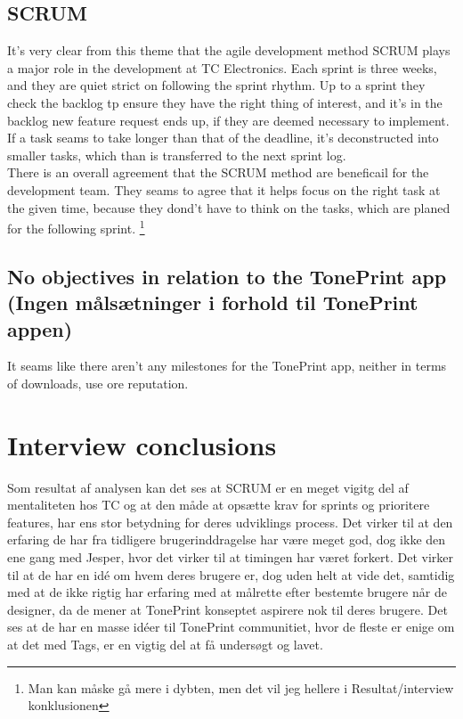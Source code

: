 \subsection*{SCRUM}
\label{ThemeScrum}
It's very clear from this theme that the agile development method SCRUM plays a major role in the development at TC Electronics. Each sprint is three weeks, and they are quiet strict on following the sprint rhythm. Up to a sprint they check the backlog tp ensure they have the right thing of interest, and it's in the backlog new feature request ends up, if they are deemed necessary to implement. If a task seams to take longer than that of the deadline, it's deconstructed into smaller tasks, which than is transferred to the next sprint log.\\
There is an overall agreement that the SCRUM method are beneficail for the development team. They seams to agree that it helps focus on the right task at the given time, because they dond't have to think on the tasks, which are planed for the following sprint. \footnote{Man kan måske gå mere i dybten, men det vil jeg hellere i Resultat/interview konklusionen} 

\subsection*{No objectives in relation to the TonePrint app (Ingen målsætninger i forhold til TonePrint appen)} 
\label{ThemeNoObjectivesInRelationToTheTonePrintApp}
It seams like there aren't any milestones for the TonePrint app, neither in terms of downloads, use ore reputation. 


\section{Interview conclusions}
\label{InterviewConclusion}
Som resultat af analysen kan det ses at SCRUM er en meget vigitg del af mentaliteten hos TC og at den måde at opsætte krav for sprints og prioritere features, har ens stor betydning for deres udviklings process. Det virker til at den erfaring de har fra tidligere brugerinddragelse har være meget god, dog ikke den ene gang med Jesper, hvor det virker til at timingen har været forkert. Det virker til at de har en idé om hvem deres brugere er, dog uden helt at vide det, samtidig med at de ikke rigtig har erfaring med at målrette efter bestemte brugere når de designer, da de mener at TonePrint konseptet aspirere nok til deres brugere. Det ses at de har en masse idéer til TonePrint communitiet, hvor de fleste er enige om at det med Tags, er en vigtig del at få undersøgt og lavet.

